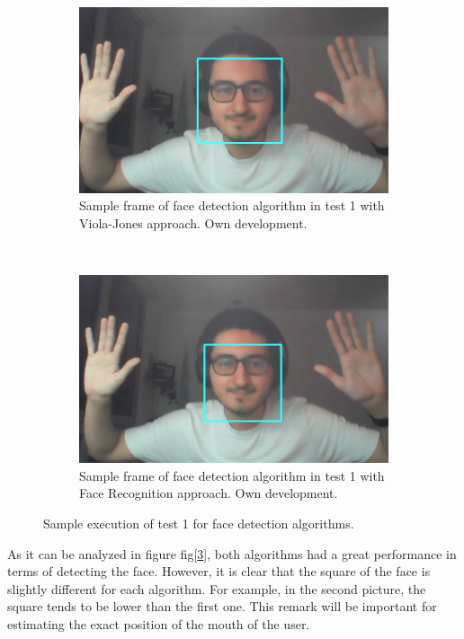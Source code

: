 \documentclass[11pt]{report} %
\begin{document}
\begin{figure}[H]
	\centering
	\begin{subfigure}{.5\textwidth}
		\centering
		\includegraphics[width=1.0\linewidth]{assets/imgs/computer_vision/face_detection_ex_1_hc.png}
		\caption{Sample frame of face detection algorithm in test 1 with Viola-Jones approach. Own development.}
		\label{fig_computer_vision_test_1_a}
	\end{subfigure}~
	\begin{subfigure}{.5\textwidth}
		\centering
		\includegraphics[width=1.0\linewidth]{assets/imgs/computer_vision/face_detection_ex_1_fr.png}
		\caption{Sample frame of face detection algorithm in test 1 with Face Recognition approach. Own development.}
		\label{fig_computer_vision_test_1_b}
	\end{subfigure}%
	\caption{Sample execution of test 1 for face detection algorithms.}
	\label{fig_computer_vision_test_1}
\end{figure}

As it can be analyzed in figure fig[\ref{fig_computer_vision_test_1}], both algorithms had a great performance in terms of detecting the face. However, it is clear that the square of the face is slightly different for each algorithm. For example, in the second picture, the square tends to be lower than the first one. This remark will be important for estimating the exact position of the mouth of the user.\\
\end{document}
